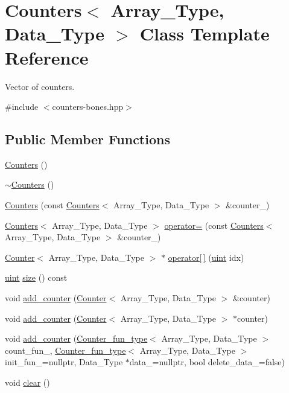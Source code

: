 \hypertarget{class_counters}{}\section{Counters$<$ Array\+\_\+\+Type, Data\+\_\+\+Type $>$ Class Template Reference}
\label{class_counters}


Vector of counters.  




{\ttfamily \#include $<$counters-\/bones.\+hpp$>$}

\subsection*{Public Member Functions}
\begin{DoxyCompactItemize}
\item 
\hyperlink{class_counters_a98e4efd06b3d878609911e392a8f42ce}{Counters} ()
\item 
\hyperlink{class_counters_a6ce3fa5d32d646efb5d83fa1feaf5e95}{$\sim$\+Counters} ()
\item 
\hyperlink{class_counters_a178c0267c1f52a36e10e9d257a21a224}{Counters} (const \hyperlink{class_counters}{Counters}$<$ Array\+\_\+\+Type, Data\+\_\+\+Type $>$ \&counter\+\_\+)
\item 
\hyperlink{class_counters}{Counters}$<$ Array\+\_\+\+Type, Data\+\_\+\+Type $>$ \hyperlink{class_counters_a0edeb22b0b1640f7ada1ef47a30ac486}{operator=} (const \hyperlink{class_counters}{Counters}$<$ Array\+\_\+\+Type, Data\+\_\+\+Type $>$ \&counter\+\_\+)
\item 
\hyperlink{class_counter}{Counter}$<$ Array\+\_\+\+Type, Data\+\_\+\+Type $>$ $\ast$ \hyperlink{class_counters_a9c3ff72b5e24a299e3c1aecad0ea5eb2}{operator\mbox{[}$\,$\mbox{]}} (\hyperlink{typedefs_8hpp_a91ad9478d81a7aaf2593e8d9c3d06a14}{uint} idx)
\item 
\hyperlink{typedefs_8hpp_a91ad9478d81a7aaf2593e8d9c3d06a14}{uint} \hyperlink{class_counters_af213b17c55496b565ad6ce7a9b0a56e1}{size} () const
\item 
void \hyperlink{class_counters_a5b5dafc7a3e0eedae400457f69937613}{add\+\_\+counter} (\hyperlink{class_counter}{Counter}$<$ Array\+\_\+\+Type, Data\+\_\+\+Type $>$ \&counter)
\item 
void \hyperlink{class_counters_a74f054aa9ea64103c2d9f79f115777d4}{add\+\_\+counter} (\hyperlink{class_counter}{Counter}$<$ Array\+\_\+\+Type, Data\+\_\+\+Type $>$ $\ast$counter)
\item 
void \hyperlink{class_counters_a4ee47504f9c76892c6028619e6b138ee}{add\+\_\+counter} (\hyperlink{typedefs_8hpp_ac0160f52f564dea3ac033b374cffbfe7}{Counter\+\_\+fun\+\_\+type}$<$ Array\+\_\+\+Type, Data\+\_\+\+Type $>$ count\+\_\+fun\+\_\+, \hyperlink{typedefs_8hpp_ac0160f52f564dea3ac033b374cffbfe7}{Counter\+\_\+fun\+\_\+type}$<$ Array\+\_\+\+Type, Data\+\_\+\+Type $>$ init\+\_\+fun\+\_\+=nullptr, Data\+\_\+\+Type $\ast$data\+\_\+=nullptr, bool delete\+\_\+data\+\_\+=false)
\item 
void \hyperlink{class_counters_ae4635c154970a13ce88d2e982fe7dab3}{clear} ()
\end{DoxyCompactItemize}


